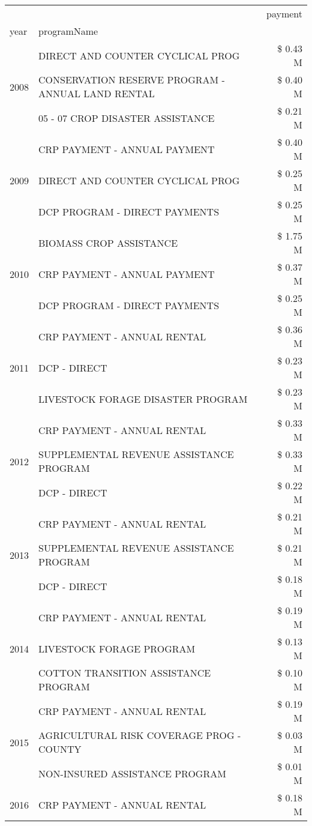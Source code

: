 \begin{tabular}{llr}
\toprule
 &  & payment \\
year & programName &  \\
\midrule
\multirow[t]{3}{*}{2008} & DIRECT AND COUNTER CYCLICAL PROG & \$ 0.43 M \\
 & CONSERVATION RESERVE PROGRAM - ANNUAL LAND RENTAL & \$ 0.40 M \\
 & 05 - 07 CROP DISASTER ASSISTANCE & \$ 0.21 M \\
\cline{1-3}
\multirow[t]{3}{*}{2009} & CRP PAYMENT - ANNUAL PAYMENT & \$ 0.40 M \\
 & DIRECT AND COUNTER CYCLICAL PROG & \$ 0.25 M \\
 & DCP PROGRAM - DIRECT PAYMENTS & \$ 0.25 M \\
\cline{1-3}
\multirow[t]{3}{*}{2010} & BIOMASS CROP ASSISTANCE & \$ 1.75 M \\
 & CRP PAYMENT - ANNUAL PAYMENT & \$ 0.37 M \\
 & DCP PROGRAM - DIRECT PAYMENTS & \$ 0.25 M \\
\cline{1-3}
\multirow[t]{3}{*}{2011} & CRP PAYMENT - ANNUAL RENTAL & \$ 0.36 M \\
 & DCP - DIRECT & \$ 0.23 M \\
 & LIVESTOCK FORAGE DISASTER PROGRAM & \$ 0.23 M \\
\cline{1-3}
\multirow[t]{3}{*}{2012} & CRP PAYMENT - ANNUAL RENTAL & \$ 0.33 M \\
 & SUPPLEMENTAL REVENUE ASSISTANCE PROGRAM & \$ 0.33 M \\
 & DCP - DIRECT & \$ 0.22 M \\
\cline{1-3}
\multirow[t]{3}{*}{2013} & CRP PAYMENT - ANNUAL RENTAL & \$ 0.21 M \\
 & SUPPLEMENTAL REVENUE ASSISTANCE PROGRAM & \$ 0.21 M \\
 & DCP - DIRECT & \$ 0.18 M \\
\cline{1-3}
\multirow[t]{3}{*}{2014} & CRP PAYMENT - ANNUAL RENTAL & \$ 0.19 M \\
 & LIVESTOCK FORAGE PROGRAM & \$ 0.13 M \\
 & COTTON TRANSITION ASSISTANCE PROGRAM & \$ 0.10 M \\
\cline{1-3}
\multirow[t]{3}{*}{2015} & CRP PAYMENT - ANNUAL RENTAL & \$ 0.19 M \\
 & AGRICULTURAL RISK COVERAGE PROG - COUNTY & \$ 0.03 M \\
 & NON-INSURED ASSISTANCE PROGRAM & \$ 0.01 M \\
\cline{1-3}
\multirow[t]{3}{*}{2016} & CRP PAYMENT - ANNUAL RENTAL                   & \$ 0.18 M \\

\end{tabular}
